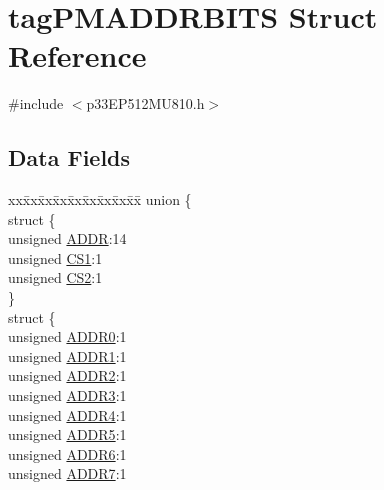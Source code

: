\hypertarget{structtag_p_m_a_d_d_r_b_i_t_s}{}\section{tag\+P\+M\+A\+D\+D\+R\+B\+I\+TS Struct Reference}
\label{structtag_p_m_a_d_d_r_b_i_t_s}


{\ttfamily \#include $<$p33\+E\+P512\+M\+U810.\+h$>$}

\subsection*{Data Fields}
\begin{DoxyCompactItemize}
\item 
\begin{tabbing}
xx\=xx\=xx\=xx\=xx\=xx\=xx\=xx\=xx\=\kill
union \{\\
\>struct \{\\
\>\>unsigned \hyperlink{structtag_p_m_a_d_d_r_b_i_t_s_a086bf948e86b578064844ddab11f4a23}{ADDR}:14\\
\>\>unsigned \hyperlink{structtag_p_m_a_d_d_r_b_i_t_s_aa09f7cd5c3d252070a01179a98c378b8}{CS1}:1\\
\>\>unsigned \hyperlink{structtag_p_m_a_d_d_r_b_i_t_s_a82995279277458a239760ec933372aa3}{CS2}:1\\
\>\} \\
\>struct \{\\
\>\>unsigned \hyperlink{structtag_p_m_a_d_d_r_b_i_t_s_a24ef08834f46348a8952932c26627135}{ADDR0}:1\\
\>\>unsigned \hyperlink{structtag_p_m_a_d_d_r_b_i_t_s_aaa7f2c8710684d5d10772363f61b8de9}{ADDR1}:1\\
\>\>unsigned \hyperlink{structtag_p_m_a_d_d_r_b_i_t_s_a9f493e5a052173cfc841fa3cdcbbb81d}{ADDR2}:1\\
\>\>unsigned \hyperlink{structtag_p_m_a_d_d_r_b_i_t_s_a3082e9377bdcde660ce3aca6b387846a}{ADDR3}:1\\
\>\>unsigned \hyperlink{structtag_p_m_a_d_d_r_b_i_t_s_a339ad669c75427adf420d9a535f05a0e}{ADDR4}:1\\
\>\>unsigned \hyperlink{structtag_p_m_a_d_d_r_b_i_t_s_a80d7fff957cd8bed82ef2387cd893e24}{ADDR5}:1\\
\>\>unsigned \hyperlink{structtag_p_m_a_d_d_r_b_i_t_s_a0a993be153f605262b1e560b2ad4cab1}{ADDR6}:1\\
\>\>unsigned \hyperlink{structtag_p_m_a_d_d_r_b_i_t_s_ad94b17128bb6ea727808ac46a81c418e}{ADDR7}:1\\

\end{tabbing}
\end{DoxyCompactItemize}
